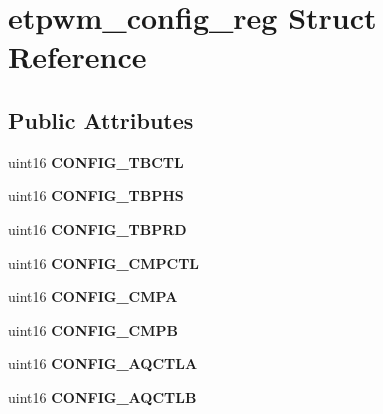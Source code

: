 \hypertarget{structetpwm__config__reg}{}\section{etpwm\+\_\+config\+\_\+reg Struct Reference}
\label{structetpwm__config__reg}
\subsection*{Public Attributes}
\begin{DoxyCompactItemize}
\item 
\mbox{\label{structetpwm__config__reg_ae9f8daef6d431d29dd32c5242774cc8a}} 
uint16 {\bfseries C\+O\+N\+F\+I\+G\+\_\+\+T\+B\+C\+TL}
\item 
\mbox{\label{structetpwm__config__reg_a87a09fb6dad19414013358ddd203b0ff}} 
uint16 {\bfseries C\+O\+N\+F\+I\+G\+\_\+\+T\+B\+P\+HS}
\item 
\mbox{\label{structetpwm__config__reg_ab7efdcec2b1d84fce6e5d7c8980f7a12}} 
uint16 {\bfseries C\+O\+N\+F\+I\+G\+\_\+\+T\+B\+P\+RD}
\item 
\mbox{\label{structetpwm__config__reg_add993af9b611f45b9ef499d505dff114}} 
uint16 {\bfseries C\+O\+N\+F\+I\+G\+\_\+\+C\+M\+P\+C\+TL}
\item 
\mbox{\label{structetpwm__config__reg_a6340e956aae63146d469be5f8f17040d}} 
uint16 {\bfseries C\+O\+N\+F\+I\+G\+\_\+\+C\+M\+PA}
\item 
\mbox{\label{structetpwm__config__reg_a7851cdbcaf152c2b18a0cadda0894707}} 
uint16 {\bfseries C\+O\+N\+F\+I\+G\+\_\+\+C\+M\+PB}
\item 
\mbox{\label{structetpwm__config__reg_a00872db4a1eec4de489ea3b49213f309}} 
uint16 {\bfseries C\+O\+N\+F\+I\+G\+\_\+\+A\+Q\+C\+T\+LA}
\item 
\mbox{\label{structetpwm__config__reg_af1afd2ce82b3f6f6f6dc6a008a34dbcb}} 
uint16 {\bfseries C\+O\+N\+F\+I\+G\+\_\+\+A\+Q\+C\+T\+LB}

\end{DoxyCompactItemize}
